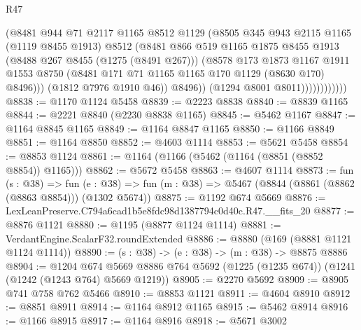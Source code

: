 \begin{lexlean}{R47}
\begin{coremodule}
                            (@8481
                              @944
                              @71
                              @2117
                              @1165
                              @8512
                              @1129
                              (@8505
                                @345
                                @943
                                @2115
                                @1165
                                (@1119 @8455 @1913)
                                @8512
                                (@8481
                                  @866
                                  @519
                                  @1165
                                  @1875
                                  @8455
                                  @1913
                                  (@8488 @267 @8455 (@1275 (@8491 @267)))
                                  (@8578
                                    @173
                                    @1873
                                    @1167
                                    @1911
                                    @1553
                                    @8750
                                    (@8481 @171 @71 @1165 @1165 @170 @1129 (@8630 @170) @8496)))
                                (@1812 @7976 @1910 @46))
                              @8496))
                          (@1294 @8001 @8011))))))))))))
@8838 := @1170 @1124 @5458
@8839 := @2223 @8838
@8840 := @8839 @1165
@8844 := @2221 @8840 (@2230 @8838 @1165)
@8845 := @5462 @1167
@8847 := @1164 @8845 @1165
@8849 := @1164 @8847 @1165
@8850 := @1166 @8849
@8851 := @1164 @8850
@8852 := @4603 @1114
@8853 := @5621 @5458
@8854 := @8853 @1124
@8861 := @1164 (@1166 (@5462 (@1164 (@8851 (@8852 @8854)) @1165)))
@8862 := @5672 @5458
@8863 := @4607 @1114
@8873 := fun (s : @38) =>
  fun (e : @38) => fun (m : @38) => @5467 (@8844 (@8861 (@8862 (@8863 @8854))) (@1302 @5674))
@8875 := @1192 @674 @5669
@8876 := LexLeanPreserve.C794a6cad1b5e8fdc98d1387794c0d40c.R47.__fits_20
@8877 := @8876 @1121
@8880 := @1195 (@8877 @1124 @1114)
@8881 := VerdantEngine.ScalarF32.roundExtended
@8886 := @8880 (@169 (@8881 @1121 @1124 @1114))
@8890 := (s : @38) -> (e : @38) -> (m : @38) -> @8875 @8886
@8904 := @1204
    @674
    @5669
    @8886
    @764
    @5692
    (@1225 (@1235 @674))
    (@1241 (@1242 (@1243 @764) @5669 @1219))
@8905 := @2270 @5692
@8909 := @8905 @741 @758 @762 @5466
@8910 := @8853 @1121
@8911 := @4604 @8910
@8912 := @8851 @8911
@8914 := @1164 @8912 @1165
@8915 := @5462 @8914
@8916 := @1166 @8915
@8917 := @1164 @8916
@8918 := @5671 @3002

\end{coremodule}
\end{lexlean}
